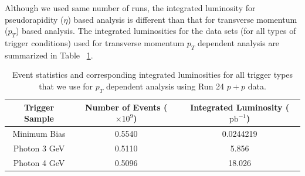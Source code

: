 Although we used same number of runs, the integrated luminosity for pseudorapidity ($\eta$) based analysis is different than that for transverse momentum ($p_T$) based analysis. The integrated luminosities for the data sets (for all types of trigger conditions) used for transverse momentum $p_T$ dependent analysis are summarized in Table ~\ref{tab:lumi_pT}.



\begin{table}[htbp]
\centering
\small
\setlength{\tabcolsep}{5pt}

\caption{Event statistics and corresponding integrated luminosities for all trigger types that we use for $p_T$ dependent analysis using Run 24 $p+p$ data.}
\label{tab:lumi_pT}

\begin{tabular}{c c c}
\hline
Trigger Sample & Number of Events ($\times 10^9$) & Integrated Luminosity ($\mathrm{pb}^{-1}$) \\
\hline
Minimum Bias & 0.5540 & 0.0244219 \\
Photon 3 GeV     & 0.5110 & 5.856 \\
Photon 4 GeV     & 0.5096 & 18.026 \\
\hline
\end{tabular}
\end{table}

